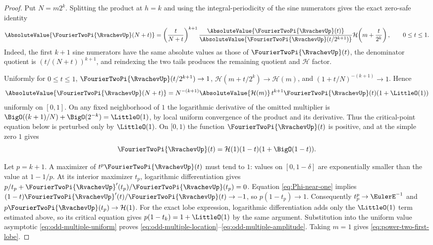\documentclass[11pt,oneside]{article}
\numberwithin{equation}{section}
\theoremstyle{definition}
\theoremstyle{remark}
\begin{document}
\begin{proof}
Put $N=m2^k$.  Splitting the product at $h=k$ and using the integral-periodicity of the
sine numerators gives the exact zero-safe identity
\begin{equation}
 \AbsoluteValue{\FourierTwoPi{\RvachevUp}(N+t)}
 =\left(\frac{t}{N+t}\right)^{k+1}
   \frac{\AbsoluteValue{\FourierTwoPi{\RvachevUp}(t)}}{\AbsoluteValue{\FourierTwoPi{\RvachevUp}(t/2^{k+1})}}
   \mathcal H\!\left(m+\frac{t}{2^k}\right),
 \qquad 0\le t\le1.
 \label{eq:odd-multiple-exact}
\end{equation}
Indeed, the first $k+1$ sine numerators have the same absolute values as those of
$\FourierTwoPi{\RvachevUp}(t)$, the denominator quotient is $(t/(N+t))^{k+1}$, and reindexing the two tails
produces the remaining quotient and $\mathcal H$ factor.

Uniformly for $0\le t\le1$,
$\FourierTwoPi{\RvachevUp}(t/2^{k+1})\to1$,
$\mathcal H(m+t/2^k)\to\mathcal H(m)$, and
$(1+t/N)^{-(k+1)}\to1$.  Hence
\begin{equation}
 \AbsoluteValue{\FourierTwoPi{\RvachevUp}(N+t)}
 =N^{-(k+1)}\AbsoluteValue{\mathcal H(m)}\,t^{k+1}\FourierTwoPi{\RvachevUp}(t)(1+\LittleO(1))
 \label{eq:odd-multiple-uniform}
\end{equation}
uniformly on $[0,1]$.  On any fixed neighborhood of $1$ the logarithmic derivative of the omitted multiplier is
$\BigO((k+1)/N)+\BigO(2^{-k})=\LittleO(1)$, by local uniform convergence of the product and its
derivative.  Thus the critical-point equation below is perturbed only by $\LittleO(1)$.
On $[0,1)$ the function $\FourierTwoPi{\RvachevUp}(t)$ is positive, and
 at the simple zero $1$ gives
\begin{equation}
 \FourierTwoPi{\RvachevUp}(t)=\mathcal H(1)(1-t)(1+\BigO(1-t)).
 \label{eq:Phi-near-one}
\end{equation}

Let $p=k+1$.  A maximizer of $t^p\FourierTwoPi{\RvachevUp}(t)$ must tend to $1$: values on
$[0,1-\delta]$ are exponentially smaller than the value at $1-1/p$.  At its interior
maximizer $t_p$, logarithmic differentiation gives
$p/t_p+\FourierTwoPi{\RvachevUp}'(t_p)/\FourierTwoPi{\RvachevUp}(t_p)=0$.  Equation \eqref{eq:Phi-near-one} implies
$(1-t)\FourierTwoPi{\RvachevUp}'(t)/\FourierTwoPi{\RvachevUp}(t)\to-1$, so $p(1-t_p)\to1$.  Consequently
$t_p^p\to\EulerE^{-1}$ and
$p\FourierTwoPi{\RvachevUp}(t_p)\to\mathcal H(1)$.  For the exact lobe expression, logarithmic
differentiation adds only the $\LittleO(1)$ term estimated above, so its critical equation gives
$p(1-t_k)=1+\LittleO(1)$ by the same argument.  Substitution into the uniform value asymptotic
\eqref{eq:odd-multiple-uniform} proves
\eqref{eq:odd-multiple-location}--\eqref{eq:odd-multiple-amplitude}.  Taking $m=1$ gives
\eqref{eq:power-two-first-lobe}.
\end{proof}
\end{document}
